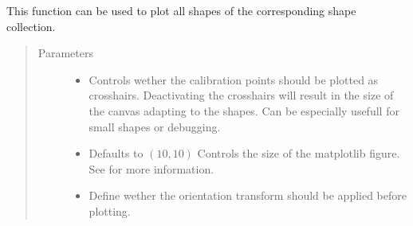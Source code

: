 \documentclass[a4paper,10pt,english,openany,oneside]{sphinxmanual}
\begin{document}
\begin{fulllineitems}
\begin{fulllineitems}
\label{\detokenize{pages/modules:lmd.lib.Collection.plot}}
\sphinxAtStartPar
This function can be used to plot all shapes of the corresponding shape collection.
\begin{quote}\begin{description}
\item[{Parameters}] \leavevmode\begin{itemize}
\item {} 
\sphinxAtStartPar
{} \textendash{} Controls wether the calibration points should be plotted as crosshairs. Deactivating the crosshairs will result in the size of the canvas adapting to the shapes. Can be especially usefull for small shapes or debugging.

\item {} 
\sphinxAtStartPar
{} \textendash{} Defaults to \((10, 10)\) Controls the size of the matplotlib figure. See  for more information.

\item {} 
\sphinxAtStartPar
{} \textendash{} Define wether the orientation transform should be applied before plotting.


\end{itemize}
\end{description}
\end{quote}
\end{fulllineitems}
\end{fulllineitems}
\end{document}
